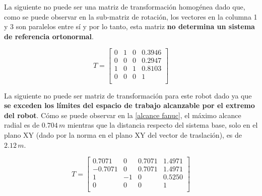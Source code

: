 \documentclass[a4paper,12pt]{article}
\begin{document}
La siguiente no puede ser una matriz de transformación homogénea dado que,
como se puede observar en la sub-matriz de rotación, los vectores en la columna 1 y 3 son paralelos entre sí 
y por lo tanto, esta matriz \textbf{no determina un sistema de referencia ortonormal}.

\begin{equation*}
    T = 
    \begin{bmatrix}
        0 & 1 & 0 & 0.3946\\
        0 & 0 & 0 & 0.2947\\
        1 & 0 & 1 & 0.8103\\
        0 & 0 & 0 & 1     \\
    \end{bmatrix}
\end{equation*}

La siguiente no puede ser matriz de transformación para este robot dado ya que \textbf{se exceden
los límites del espacio de trabajo alcanzable por el extremo del robot}. Cómo se puede observar en la
\cref{alcance fanuc}, el máximo alcance radial es de $0.704\,m$ mientras que la distancia respecto del sistema base,
solo en el plano XY (dado por la norma en el plano XY del vector de traslación), es de $2.12\,m$.

\begin{equation*}
    T = 
    \begin{bmatrix}
        0.7071  &  0  & 0.7071 & 1.4971\\
        -0.7071 &  0  & 0.7071 & 1.4971\\
        1       & -1  &    0   & 0.5250\\
        0       &  0  &    0   &    1  \\
    \end{bmatrix}
\end{equation*}
\end{document}
